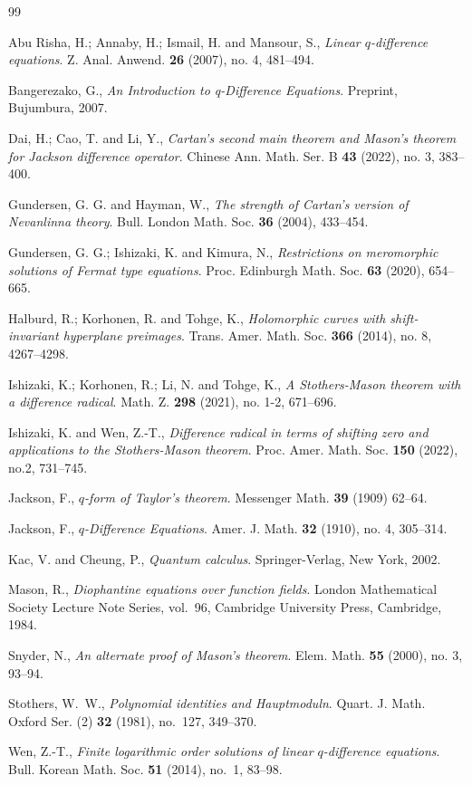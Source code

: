 \documentclass[a4paper,12pt]{article}
\numberwithin{equation}{section}
\begin{document}
\begin{thebibliography}{99}

Abu Risha, H.; Annaby, H.; Ismail, H. and Mansour, S.,
\emph{Linear $q$-difference equations}.
Z. Anal. Anwend. \textbf{26} (2007), no. 4, 481--494.

Bangerezako, G., \emph{An Introduction to q-Difference Equations}. 
Preprint, Bujumbura, 2007.

Dai, H.; Cao, T. and Li, Y.,
\emph{Cartan's second main theorem and Mason's theorem for Jackson difference operator}.
Chinese Ann. Math. Ser. B \textbf{43} (2022), no. 3, 383--400.

Gundersen, G. G. and Hayman, W.,
\emph{The strength of Cartan's version of Nevanlinna theory}.
Bull. London Math. Soc. \textbf{36} (2004), 433--454.

Gundersen, G. G.; Ishizaki, K. and Kimura, N.,
\emph{Restrictions on meromorphic solutions of Fermat type equations}.
Proc. Edinburgh Math. Soc. \textbf{63} (2020), 654--665.

Halburd, R.; Korhonen, R. and Tohge, K.,
\emph{Holomorphic curves with shift-invariant hyperplane preimages}.
Trans. Amer. Math. Soc. \textbf{366} (2014), no. 8, 4267--4298.

Ishizaki, K.; Korhonen, R.; Li, N. and Tohge, K.,
\emph{A Stothers-Mason theorem with a difference radical}.
Math. Z. \textbf{298} (2021), no. 1-2, 671--696.

Ishizaki, K. and Wen, Z.-T.,
\emph{Difference radical in terms of shifting zero and applications to the Stothers-Mason theorem}.
Proc. Amer. Math. Soc. \textbf{150} (2022), no.2, 731--745.

Jackson, F.,
\emph{$q$-form of Taylor's theorem}.
Messenger Math. \textbf{39} (1909) 62--64.


Jackson, F.,
\emph{$q$-Difference Equations}.
Amer. J. Math. \textbf{32} (1910), no. 4, 305--314.

Kac, V. and Cheung, P.,
\emph{Quantum calculus}.
Springer-Verlag, New York, 2002.

Mason, R.,
 \emph{Diophantine equations over function fields}.
 London Mathematical Society Lecture Note Series, vol.~96,
 Cambridge University Press, Cambridge, 1984.

Snyder, N.,
\emph{An alternate proof of Mason's theorem}.
Elem. Math. \textbf{55} (2000), no. 3, 93--94.

Stothers, W.~W.,
\emph{Polynomial identities and {H}auptmoduln}.
Quart. J. Math. Oxford Ser. (2) \textbf{32} (1981), no.~127, 349--370.

Wen, Z.-T.,
\emph{Finite logarithmic order solutions of linear  $q$-difference equations}.
Bull. Korean Math. Soc. \textbf{51} (2014), no.~1, 83--98.

\end{thebibliography}
\end{document}
